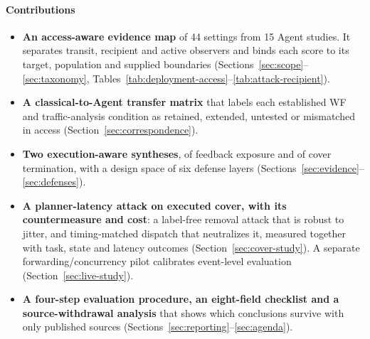 \paragraph{Contributions}
\begin{itemize}
\item \textbf{An access-aware evidence map} of 44 settings from 15 Agent studies. It separates transit, recipient and active observers and binds each score to its target, population and supplied boundaries (Sections~\ref{sec:scope}--\ref{sec:taxonomy}, Tables~\ref{tab:deployment-access}--\ref{tab:attack-recipient}).
\item \textbf{A classical-to-Agent transfer matrix} that labels each established WF and traffic-analysis condition as retained, extended, untested or mismatched in access (Section~\ref{sec:correspondence}).
\item \textbf{Two execution-aware syntheses}, of feedback exposure and of cover termination, with a design space of six defense layers (Sections~\ref{sec:evidence}--\ref{sec:defenses}).
\item \textbf{A planner-latency attack on executed cover, with its countermeasure and cost}: a label-free removal attack that is robust to jitter, and timing-matched dispatch that neutralizes it, measured together with task, state and latency outcomes (Section~\ref{sec:cover-study}). A separate forwarding/concurrency pilot calibrates event-level evaluation (Section~\ref{sec:live-study}).
\item \textbf{A four-step evaluation procedure, an eight-field checklist and a source-withdrawal analysis} that shows which conclusions survive with only published sources (Sections~\ref{sec:reporting}--\ref{sec:agenda}).
\end{itemize}
